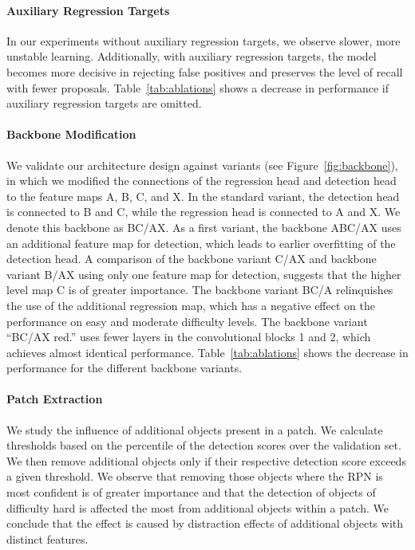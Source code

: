 \documentclass{article}
\begin{document}
\paragraph{Auxiliary Regression Targets}
In our experiments without auxiliary regression targets, we observe slower, more unstable learning.
Additionally, with auxiliary regression targets, the model becomes more decisive in rejecting false positives and preserves the level of recall with fewer proposals. Table~\ref{tab:ablations} shows a decrease in performance if auxiliary regression targets are omitted. 

\paragraph{Backbone Modification}
We validate our architecture design against variants 
(see Figure~\ref{fig:backbone}), in which we modified
the connections of the regression head and detection head to
the feature maps A, B, C, and X. In the standard variant,
the detection head is connected to B and C, while the
regression head is connected to A and X. We denote this backbone as BC/AX. 
As a first variant, the backbone ABC/AX uses an additional feature map
for detection, which leads to earlier overfitting of the detection head. 
A comparison of the backbone variant C/AX and backbone variant B/AX using only one feature
map for detection, suggests that the higher level map C is of greater importance.
The backbone variant BC/A relinquishes the use of the additional regression map, which
has a negative effect on the performance on easy and moderate difficulty levels.  
The backbone variant ``BC/AX red.''  uses fewer layers in the convolutional
blocks 1 and 2, which achieves almost identical performance. 
Table~\ref{tab:ablations} shows the decrease in
performance for the different backbone variants.

\paragraph{Patch Extraction}
We study the influence of additional objects present in a patch. We calculate thresholds based on the percentile of the detection scores over the validation set. We then remove additional objects only if their respective detection score exceeds a given threshold.
We observe that removing those objects where the RPN is most confident is of greater importance and that the detection of objects of difficulty hard is affected the most from additional objects within a patch. We conclude that the effect is caused by distraction effects of additional objects with distinct features. 
\end{document}
